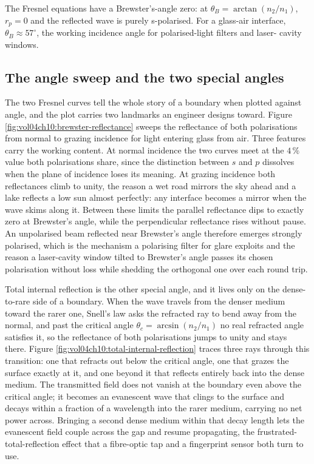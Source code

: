 The Fresnel equations have a Brewster's-angle zero: at $\theta_{B} =
\arctan(n_{2}/n_{1})$, $r_{p} = 0$ and the reflected wave is purely
s-polarised. For a glass-air interface, $\theta_{B} \approx 57^{\circ}$,
the working incidence angle for polarised-light filters and laser-
cavity windows.

\subsection{The angle sweep and the two special angles}

The two Fresnel curves tell the whole story of a boundary when plotted
against angle, and the plot carries two landmarks an engineer designs
toward. Figure \ref{fig:vol04ch10:brewster-reflectance} sweeps the
reflectance of both polarisations from normal to grazing incidence for
light entering glass from air. Three features carry the working content.
At normal incidence the two curves meet at the $4\,\%$ value both
polarisations share, since the distinction between $s$ and $p$ dissolves
when the plane of incidence loses its meaning. At grazing incidence both
reflectances climb to unity, the reason a wet road mirrors the sky ahead
and a lake reflects a low sun almost perfectly: any interface becomes a
mirror when the wave skims along it. Between these limits the parallel
reflectance dips to exactly zero at Brewster's angle, while the
perpendicular reflectance rises without pause. An unpolarised beam
reflected near Brewster's angle therefore emerges strongly polarised,
which is the mechanism a polarising filter for glare exploits and the
reason a laser-cavity window tilted to Brewster's angle passes its
chosen polarisation without loss while shedding the orthogonal one over
each round trip.



Total internal reflection is the other special angle, and it lives only
on the dense-to-rare side of a boundary. When the wave travels from the
denser medium toward the rarer one, Snell's law asks the refracted ray to
bend away from the normal, and past the critical angle $\theta_c =
\arcsin(n_2/n_1)$ no real refracted angle satisfies it, so the reflectance
of both polarisations jumps to unity and stays there. Figure
\ref{fig:vol04ch10:total-internal-reflection} traces three rays through
this transition: one that refracts out below the critical angle, one that
grazes the surface exactly at it, and one beyond it that reflects entirely
back into the dense medium. The transmitted field does not vanish at the
boundary even above the critical angle; it becomes an evanescent wave that
clings to the surface and decays within a fraction of a wavelength into the
rarer medium, carrying no net power across. Bringing a second dense medium
within that decay length lets the evanescent field couple across the gap
and resume propagating, the frustrated-total-reflection effect that a
fibre-optic tap and a fingerprint sensor both turn to use.

